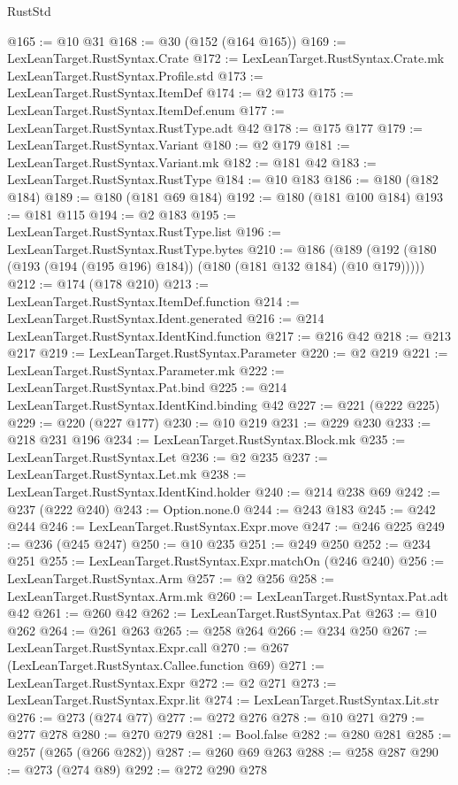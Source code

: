\begin{lexlean}{RustStd}
\begin{coremodule}
@165 := @10 @31
@168 := @30 (@152 (@164 @165))
@169 := LexLeanTarget.RustSyntax.Crate
@172 := LexLeanTarget.RustSyntax.Crate.mk LexLeanTarget.RustSyntax.Profile.std
@173 := LexLeanTarget.RustSyntax.ItemDef
@174 := @2 @173
@175 := LexLeanTarget.RustSyntax.ItemDef.enum
@177 := LexLeanTarget.RustSyntax.RustType.adt @42
@178 := @175 @177
@179 := LexLeanTarget.RustSyntax.Variant
@180 := @2 @179
@181 := LexLeanTarget.RustSyntax.Variant.mk
@182 := @181 @42
@183 := LexLeanTarget.RustSyntax.RustType
@184 := @10 @183
@186 := @180 (@182 @184)
@189 := @180 (@181 @69 @184)
@192 := @180 (@181 @100 @184)
@193 := @181 @115
@194 := @2 @183
@195 := LexLeanTarget.RustSyntax.RustType.list
@196 := LexLeanTarget.RustSyntax.RustType.bytes
@210 := @186 (@189 (@192 (@180 (@193 (@194 (@195 @196) @184)) (@180 (@181 @132 @184) (@10 @179)))))
@212 := @174 (@178 @210)
@213 := LexLeanTarget.RustSyntax.ItemDef.function
@214 := LexLeanTarget.RustSyntax.Ident.generated
@216 := @214 LexLeanTarget.RustSyntax.IdentKind.function
@217 := @216 @42
@218 := @213 @217
@219 := LexLeanTarget.RustSyntax.Parameter
@220 := @2 @219
@221 := LexLeanTarget.RustSyntax.Parameter.mk
@222 := LexLeanTarget.RustSyntax.Pat.bind
@225 := @214 LexLeanTarget.RustSyntax.IdentKind.binding @42
@227 := @221 (@222 @225)
@229 := @220 (@227 @177)
@230 := @10 @219
@231 := @229 @230
@233 := @218 @231 @196
@234 := LexLeanTarget.RustSyntax.Block.mk
@235 := LexLeanTarget.RustSyntax.Let
@236 := @2 @235
@237 := LexLeanTarget.RustSyntax.Let.mk
@238 := LexLeanTarget.RustSyntax.IdentKind.holder
@240 := @214 @238 @69
@242 := @237 (@222 @240)
@243 := Option.none.{0}
@244 := @243 @183
@245 := @242 @244
@246 := LexLeanTarget.RustSyntax.Expr.move
@247 := @246 @225
@249 := @236 (@245 @247)
@250 := @10 @235
@251 := @249 @250
@252 := @234 @251
@255 := LexLeanTarget.RustSyntax.Expr.matchOn (@246 @240)
@256 := LexLeanTarget.RustSyntax.Arm
@257 := @2 @256
@258 := LexLeanTarget.RustSyntax.Arm.mk
@260 := LexLeanTarget.RustSyntax.Pat.adt @42
@261 := @260 @42
@262 := LexLeanTarget.RustSyntax.Pat
@263 := @10 @262
@264 := @261 @263
@265 := @258 @264
@266 := @234 @250
@267 := LexLeanTarget.RustSyntax.Expr.call
@270 := @267 (LexLeanTarget.RustSyntax.Callee.function @69)
@271 := LexLeanTarget.RustSyntax.Expr
@272 := @2 @271
@273 := LexLeanTarget.RustSyntax.Expr.lit
@274 := LexLeanTarget.RustSyntax.Lit.str
@276 := @273 (@274 @77)
@277 := @272 @276
@278 := @10 @271
@279 := @277 @278
@280 := @270 @279
@281 := Bool.false
@282 := @280 @281
@285 := @257 (@265 (@266 @282))
@287 := @260 @69 @263
@288 := @258 @287
@290 := @273 (@274 @89)
@292 := @272 @290 @278

\end{coremodule}
\end{lexlean}
